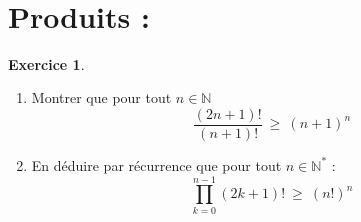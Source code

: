 \documentclass[10pt,a4paper]{article}
\newcommand{\N}{\mathbb{N}}
\theoremstyle{definition}
\theoremstyle{definition}
\newtheorem{exo}{Exercice}
\begin{document}
\quad\\
\section*{Produits :}

\begin{center}
\begin{minipage}[t]{0.45\linewidth}
\raggedright
\begin{exo}\quad\\
\begin{enumerate}
\item Montrer que pour tout $n\in\N$
$$\dfrac{(2n+1)!}{(n+1)!} \ \geq  \  (n+1)^n$$
\item En déduire par récurrence que pour tout $n\in\N^*$ : 
$$\prod_{k=0}^{n-1}(2k+1)! \ \geq \ (n!)^n$$
\end{enumerate}


\end{exo}
\end{minipage}
\end{center}
\end{document}
